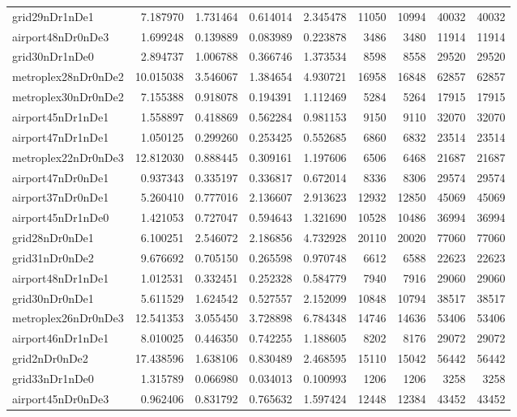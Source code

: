 \begin{longtable}{|l|r|r|r|r|r|r|r|r|}
grid29nDr1nDe1 & 7.187970 & 1.731464 & 0.614014 & 2.345478 & 11050 & 10994 & 40032 & 40032 \\
airport48nDr0nDe3 & 1.699248 & 0.139889 & 0.083989 & 0.223878 & 3486 & 3480 & 11914 & 11914 \\
grid30nDr1nDe0 & 2.894737 & 1.006788 & 0.366746 & 1.373534 & 8598 & 8558 & 29520 & 29520 \\
metroplex28nDr0nDe2 & 10.015038 & 3.546067 & 1.384654 & 4.930721 & 16958 & 16848 & 62857 & 62857 \\
metroplex30nDr0nDe2 & 7.155388 & 0.918078 & 0.194391 & 1.112469 & 5284 & 5264 & 17915 & 17915 \\
airport45nDr1nDe1 & 1.558897 & 0.418869 & 0.562284 & 0.981153 & 9150 & 9110 & 32070 & 32070 \\
airport47nDr1nDe1 & 1.050125 & 0.299260 & 0.253425 & 0.552685 & 6860 & 6832 & 23514 & 23514 \\
metroplex22nDr0nDe3 & 12.812030 & 0.888445 & 0.309161 & 1.197606 & 6506 & 6468 & 21687 & 21687 \\
airport47nDr0nDe1 & 0.937343 & 0.335197 & 0.336817 & 0.672014 & 8336 & 8306 & 29574 & 29574 \\
airport37nDr0nDe1 & 5.260410 & 0.777016 & 2.136607 & 2.913623 & 12932 & 12850 & 45069 & 45069 \\
airport45nDr1nDe0 & 1.421053 & 0.727047 & 0.594643 & 1.321690 & 10528 & 10486 & 36994 & 36994 \\
grid28nDr0nDe1 & 6.100251 & 2.546072 & 2.186856 & 4.732928 & 20110 & 20020 & 77060 & 77060 \\
grid31nDr0nDe2 & 9.676692 & 0.705150 & 0.265598 & 0.970748 & 6612 & 6588 & 22623 & 22623 \\
airport48nDr1nDe1 & 1.012531 & 0.332451 & 0.252328 & 0.584779 & 7940 & 7916 & 29060 & 29060 \\
grid30nDr0nDe1 & 5.611529 & 1.624542 & 0.527557 & 2.152099 & 10848 & 10794 & 38517 & 38517 \\
metroplex26nDr0nDe3 & 12.541353 & 3.055450 & 3.728898 & 6.784348 & 14746 & 14636 & 53406 & 53406 \\
airport46nDr1nDe1 & 8.010025 & 0.446350 & 0.742255 & 1.188605 & 8202 & 8176 & 29072 & 29072 \\
grid2nDr0nDe2 & 17.438596 & 1.638106 & 0.830489 & 2.468595 & 15110 & 15042 & 56442 & 56442 \\
grid33nDr1nDe0 & 1.315789 & 0.066980 & 0.034013 & 0.100993 & 1206 & 1206 & 3258 & 3258 \\
airport45nDr0nDe3 & 0.962406 & 0.831792 & 0.765632 & 1.597424 & 12448 & 12384 & 43452 & 43452 \\

\end{longtable}

